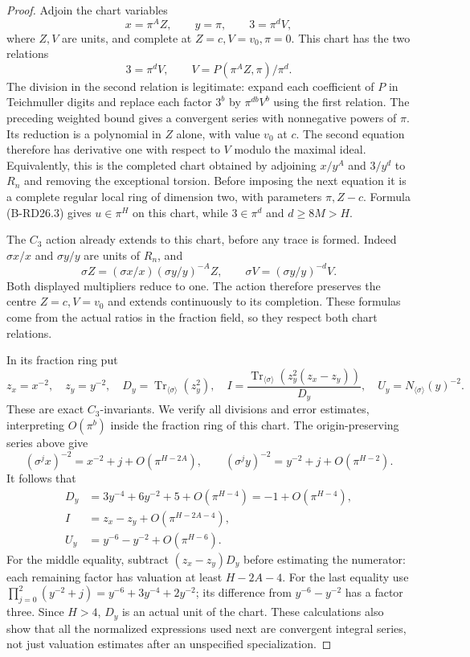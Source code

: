 \begin{proof}
Adjoin the chart variables
\[
          x=\pi^A Z,\qquad y=\pi,\qquad3=\pi^d V,
                                                        \tag{B-RD26.5}
\]
where $Z,V$ are units, and complete at $Z=c,V=v_0,\pi=0$.
This chart has the two relations
\[
           3=\pi^d V,\qquad
           V=P(\pi^A Z,\pi)/\pi^d.                    \tag{B-RD26.6}
\]
The division in the second relation is legitimate: expand each
coefficient of $P$ in Teichmuller digits and replace each factor
$3^b$ by $\pi^{db}V^b$ using the first relation. The preceding
weighted bound gives a convergent series with nonnegative powers
of $\pi$. Its reduction is a polynomial in $Z$ alone, with value
$v_0$ at $c$. The second equation therefore has derivative one
with respect to $V$ modulo the maximal ideal. Equivalently, this
is the completed chart obtained by adjoining $x/y^A$ and $3/y^d$
to $R_n$ and removing the exceptional torsion. Before imposing
the next equation it is a complete regular local ring of
dimension two, with parameters $\pi,Z-c$. Formula (B-RD26.3)
gives $u\in\pi^H$ on this chart, while $3\in\pi^d$ and
$d\geq8M>H$.

The $C_3$ action already extends to this chart, before any trace
is formed. Indeed $\sigma x/x$ and $\sigma y/y$ are units of
$R_n$, and
\[
 \sigma Z=(\sigma x/x)(\sigma y/y)^{-A}Z,\qquad
 \sigma V=(\sigma y/y)^{-d}V.
\]
Both displayed multipliers reduce to one. The action therefore
preserves the centre $Z=c,V=v_0$ and extends continuously to its
completion. These formulas come from the actual ratios in the
fraction field, so they respect both chart relations.

In its fraction ring put
\[
 z_x=x^{-2},\quad z_y=y^{-2},\quad
 D_y=\operatorname{Tr}_{\langle\sigma\rangle}(z_y^2),
 \quad
 I=\frac{\operatorname{Tr}_{\langle\sigma\rangle}
                      (z_y^2(z_x-z_y))}{D_y},\quad
 U_y=N_{\langle\sigma\rangle}(y)^{-2}.                \tag{B-RD26.7}
\]
These are exact $C_3$-invariants. We verify all divisions and
error estimates, interpreting $O(\pi^b)$ inside the fraction
ring of this chart. The origin-preserving series above give
\[
 (\sigma^j x)^{-2}=x^{-2}+j+O(\pi^{H-2A}),\qquad
 (\sigma^j y)^{-2}=y^{-2}+j+O(\pi^{H-2}).
\]
It follows that
\[
 \begin{split}
 D_y&=3y^{-4}+6y^{-2}+5+O(\pi^{H-4})
                         =-1+O(\pi^{H-4}),\\
 I&=z_x-z_y+O(\pi^{H-2A-4}),\\
 U_y&=y^{-6}-y^{-2}+O(\pi^{H-6}).
 \end{split}                                           \tag{B-RD26.8}
\]
For the middle equality, subtract $(z_x-z_y)D_y$ before
estimating the numerator: each remaining factor has valuation
at least $H-2A-4$. For the last equality use
$\prod_{j=0}^2(y^{-2}+j)=y^{-6}+3y^{-4}+2y^{-2}$;
its difference from $y^{-6}-y^{-2}$ has a factor three.
Since $H>4$, $D_y$ is an actual unit of the chart. These
calculations also show that all the normalized expressions used
next are convergent integral series, not just valuation
estimates after an unspecified specialization.


\end{proof}
